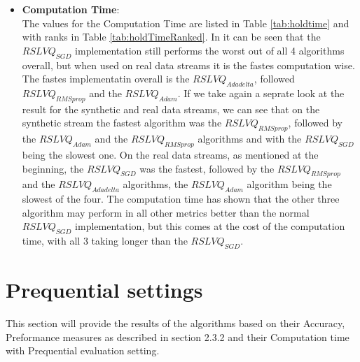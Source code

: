 \documentclass[12pt,oneside,a4paper,parskip]{scrbook}
\begin{document}
\begin{itemize}
  \item \textbf{Computation Time}: \\
        The values for the Computation Time are listed in Table \ref{tab:holdtime} and with ranks in Table \ref{tab:holdTimeRanked}.
        In it can be seen that the $RSLVQ_\textit{SGD}$ implementation still performs the worst out of all 4 algorithms overall,
        but when used on real data streams it is the fastes computation wise.
        The fastes implementatin overall is the $RSLVQ_\textit{Adadelta}$, followed $RSLVQ_\textit{RMSprop}$ and the $RSLVQ_\textit{Adam}$.
        If we take again a seprate look at the result for the synthetic and real data streams, we can see that on the synthetic stream the 
        fastest algorithm was the $RSLVQ_\textit{RMSprop}$, followed by the $RSLVQ_\textit{Adam}$ and the $RSLVQ_\textit{RMSprop}$ 
        algorithms and with the $RSLVQ_\textit{SGD}$ being the slowest one.
        On the real data streams, as mentioned at the beginning, the $RSLVQ_\textit{SGD}$ was the fastest, followed by the $RSLVQ_\textit{RMSprop}$ and
        the $RSLVQ_\textit{Adadelta}$ algorithms, the $RSLVQ_\textit{Adam}$ algorithm being the slowest of the four.
        The computation time has shown that the other three algorithm may perform in all other metrics better than the normal 
        $RSLVQ_\textit{SGD}$ implementation, but this comes at the cost of the computation time, with all 3 taking longer than the
        $RSLVQ_\textit{SGD}$.

\end{itemize}
\section{Prequential settings}
This section will provide the results of the algorithms based on their Accuracy, Preformance measures as described in section 2.3.2
and their Computation time with Prequential evaluation setting.
\end{document}

